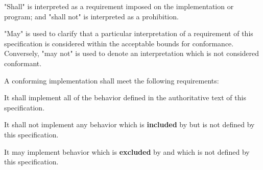 
\specitem
"Shall" is interpreted as a requirement imposed on the implementation or
program; and "shall not" is interpreted as a prohibition.

\specitem
"May" is used to clarify that a particular interpretation of a requirement of
this specification is considered within the acceptable bounds for conformance.
Conversely, "may not" is used to denote an interpretation which is not
considered conformant.

\specitem
A conforming implementation shall meet the following requirements:

\specsubitem
It shall implement all of the behavior defined in the authoritative text of this
specification.

\specsubitem
It shall not implement any behavior which is \textbf{included} by
 but is not defined by this specification.


\specsubitem
It may implement behavior which is \textbf{excluded} by  and
which is not defined by this specification.
